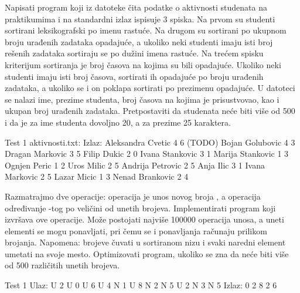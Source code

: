 \begin{Exercise}[label=509]
   Napisati program koji iz datoteke  čita
   podatke o aktivnosti studenata na praktikumima i na standardni
   izlaz ispisuje 3 spiska. Na prvom su studenti sortirani
   leksikografski po imenu rastuće. Na drugom su sortirani po ukupnom
   broju urađenih zadataka opadajuće, a ukoliko neki studenti imaju
   isti broj rešenih zadataka sortiraju se po dužini imena rastuće. Na
   trećem spisku kriterijum sortiranja je broj časova na kojima su
   bili opadajuće. Ukoliko neki studenti imaju isti broj časova,
   sortirati ih opadajuće po broju urađenih zadataka, a ukoliko se i
   on poklapa sortirati po prezimenu opadajuće. U datoteci se nalazi
   ime, prezime studenta, broj časova na kojima je prisustvovao, kao i
   ukupan broj urađenih zadataka. Pretpostaviti da studenata neće biti
   više od 500 i da je za ime studenta dovoljno 20, a za prezime 25
   karaktera.
  
\begin{miditest}
\begin{test}{Test 1}
aktivnosti.txt:               Izlaz:
Aleksandra Cvetic 4 6         (TODO)
Bojan Golubovic 4 3
Dragan Markovic 3 5
Filip Dukic 2 0 
Ivana Stankovic 3 1
Marija Stankovic 1 3 
Ognjen Peric 1 2
Uros Milic 2 5
Andrija Petrovic 2 5
Anja Ilic 3 1
Ivana Markovic 2 5
Lazar Micic 1 3
Nenad Brankovic 2 4
\end{test}
\end{miditest}
  
\end{Exercise}

\begin{Exercise}[label=510]
  Razmatrajmo dve operacije: operacija  je unos novog broja
  , a operacija  određivanje -tog po
  veličini od unetih brojeva. Implementirati program koji izvršava ove
  operacije. Može postojati najviše 100000 operacija unosa, a uneti
  elementi se mogu ponavljati, pri čemu se i ponavljanja računaju
  prilikom brojanja. Napomena: brojeve čuvati u sortiranom nizu i
  svaki naredni element umetati na svoje mesto. Optimizovati program,
  ukoliko se zna da neće biti više od 500 različitih unetih brojeva.
  
\begin{maxitest}
\begin{test}{Test 1}
Ulaz: U 2 U 0 U 6 U 4 N 1 U 8 N 2 N 5 U 2 N 3 N 5
Izlaz: 0 2 8 2 6
\end{test}
\end{maxitest}
  
\end{Exercise}

